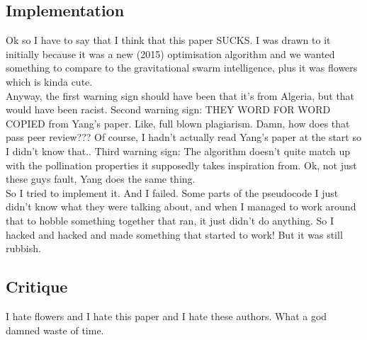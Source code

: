 \subsection{Implementation}

Ok so I have to say that I think that this paper\cite{7175923} SUCKS. I was drawn to it initially because it was a new (2015) optimisation algorithm and we wanted something to compare to the gravitational swarm intelligence\cite{gravswarm}, plus it was flowers which is kinda cute.\\
Anyway, the first warning sign should have been that it's from Algeria, but that would have been racist. Second warning sign: THEY WORD FOR WORD COPIED from Yang's paper. Like, full blown plagiarism. Damn, how does that pass peer review??? Of course, I hadn't actually read Yang's paper at the start so I didn't know that.. Third warning sign: The algorithm doesn't quite match up with the pollination properties it supposedly takes inspiration from. Ok, not just these guys fault, Yang does the same thing.\\
So I tried to implement it. And I failed. Some parts of the pseudocode I just didn't know what they were talking about, and when I managed to work around that to hobble something together that ran, it just didn't do anything. So I hacked and hacked and made something that started to work! But it was still rubbish.

\subsection{Critique}
I hate flowers and I hate this paper and I hate these authors. What a god damned waste of time.


